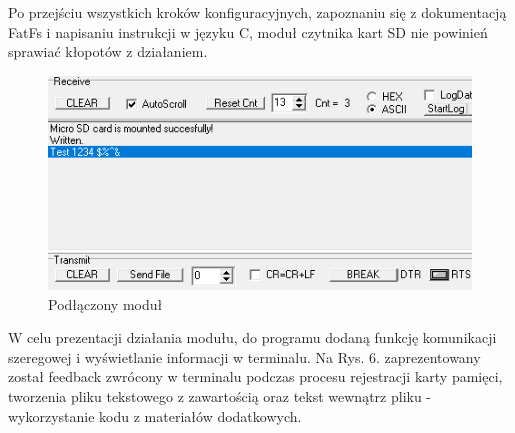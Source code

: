 \documentclass[11pt, a4paper]{article}
\begin{document}
Po przejściu wszystkich kroków konfiguracyjnych, zapoznaniu się z dokumentacją FatFs i napisaniu instrukcji w języku C, moduł czytnika kart SD nie powinień sprawiać kłopotów z działaniem. 
\begin{figure}[h!]
\centering
\includegraphics[width=1\linewidth]{fig/SD/działanie_ukladu/terminal.png}
\caption{Podłączony moduł}
\label{fig:sub2}
\end{figure}
\newline
W celu prezentacji działania modułu, do programu dodaną funkcję komunikacji szeregowej i wyświetlanie informacji w terminalu. Na Rys. 6. zaprezentowany został feedback zwrócony w terminalu podczas procesu rejestracji karty pamięci, tworzenia pliku tekstowego z zawartością oraz tekst wewnątrz pliku - wykorzystanie kodu z materiałów dodatkowych.
\end{document}

